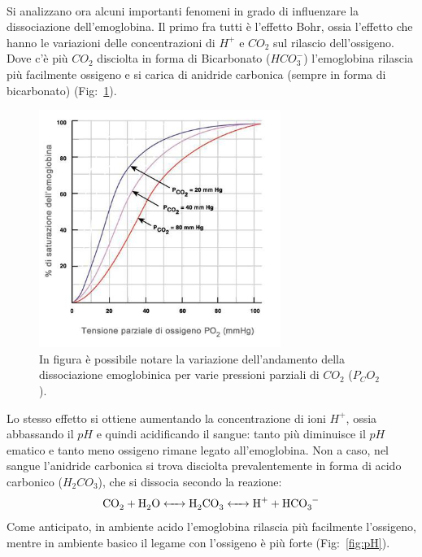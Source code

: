 \documentclass[a4paper, 12pt]{book}
\begin{document}
\\Si analizzano ora alcuni importanti fenomeni in grado di influenzare la dissociazione dell'emoglobina.
Il primo fra tutti è l'effetto Bohr, ossia l'effetto che hanno le variazioni delle concentrazioni di $H^+$ e $CO_2$ sul rilascio dell'ossigeno.
Dove c'è più $CO_2$ disciolta in forma di Bicarbonato ($HCO_3^-$) l'emoglobina rilascia più facilmente ossigeno e si carica di anidride carbonica (sempre in forma di bicarbonato) (Fig:~\ref{fig:CO2}).
\begin{figure}[h!]
    \centering
    \includegraphics[width=0.7\textwidth]{emoglobina-C02.jpeg}
    \caption{In figura è possibile notare la variazione dell'andamento della 	 		 			 dissociazione emoglobinica per varie pressioni parziali di $CO_2$ 							 ($P_CO_2$).}
    \label{fig:CO2}
\end{figure}
Lo stesso effetto si ottiene aumentando la concentrazione di ioni $H^+$, ossia abbassando il $pH$ e quindi acidificando il sangue: tanto più diminuisce il $pH$ ematico e tanto meno ossigeno rimane legato all'emoglobina.
Non a caso, nel sangue l'anidride carbonica si trova disciolta prevalentemente in forma di acido carbonico ($H_2CO_3$), che si dissocia secondo la reazione:
\begin{equation*}
    \ce{CO_2 + H_2O <-> H_2CO_3 <-> H^+ + HCO_3^-}
\end{equation*}
Come anticipato, in ambiente acido l'emoglobina rilascia più facilmente l'ossigeno, mentre in ambiente basico il legame con l'ossigeno è più forte (Fig:~\ref{fig:pH}).
\end{document}
